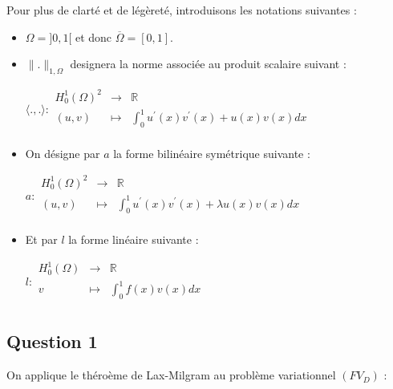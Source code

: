 \documentclass[a4paper,12pt]{article}
\begin{document}
Pour plus de clart\'e et de l\'eg\`eret\'e, introduisons les notations suivantes :
\begin{itemize}
  \item $\Omega = ]0,1[$ et donc $\overline{\Omega}=[0,1]$.
	\item $\|.\|_{1,\Omega}$ designera la norme associ\'ee au produit scalaire suivant :
	  \begin{center}
		  $\langle .,. \rangle :\begin{array}{ccccc}
      H_{0}^{1}(\Omega)^{2} & \to & \mathbb{R} \\
      (u,v) & \mapsto & \int_{0}^{1} {u^{'}(x)v^{'}(x)+u(x)v(x) dx} \\
      \end{array}$
		\end{center}
	\item On d\'esigne par $a$ la forme bilin\'eaire sym\'etrique suivante :
	  \begin{center}
		  $a :\begin{array}{ccccc}
      H_{0}^{1}(\Omega)^{2} & \to & \mathbb{R} \\
      (u,v) & \mapsto & \int_{0}^{1} {u^{'}(x)v^{'}(x)+\lambda u(x)v(x) dx} \\
      \end{array}$
		\end{center}
	\item Et par $l$ la forme lin\'eaire suivante :
	  \begin{center}
		  $l :\begin{array}{ccccc}
      H_{0}^{1}(\Omega) & \to & \mathbb{R} \\
      v & \mapsto & \int_{0}^{1} {f(x)v(x) dx} \\
      \end{array}$
		\end{center}
\end{itemize}

\subsection{Question 1}

On applique le th\'ero\`eme de Lax-Milgram au probl\`eme variationnel $(FV_D)$ :
\end{document}
